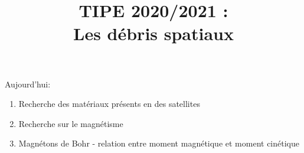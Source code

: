 \documentclass[a4paper,1pt]{article}
\title{TIPE 2020/2021 : \\ Les débris spatiaux}
\date{}
\begin{document}
 
    Aujourd'hui:
    \begin{enumerate}
        \item Recherche des matériaux présents en des satellites
        \item Recherche sur le magnétisme
        \item Magnétons de Bohr - relation entre moment magnétique et moment cinétique
    \end{enumerate}
\end{document}

